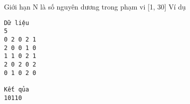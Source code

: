 Giới hạn
N là số nguyên dương trong phạm vi [1, 30]
Ví dụ
\begin{verbatim}
Dữ liệu
5
0 2 0 2 1 
2 0 0 1 0 
1 1 0 2 1 
2 0 2 0 2 
0 1 0 2 0

Kết qủa
10110

\end{verbatim}